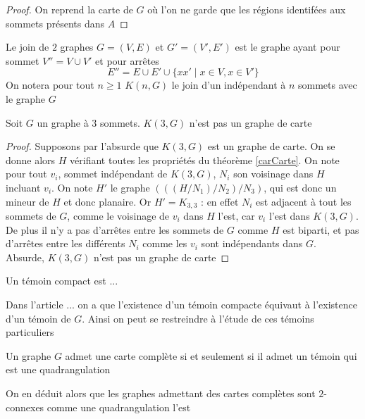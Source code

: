 \documentclass{scrartcl}
\begin{document}
\begin{flushleft}
\begin{proof}
    On reprend la carte de $G$ où l'on ne garde que les régions identifées aux sommets présents dans $A$
\end{proof}

\begin{def*}[Join]
    Le join de $2$ graphes $G = (V, E)$ et $G' = (V', E')$ est le graphe ayant pour sommet $V'' = V \cup V'$ et pour arrêtes
    \[ E'' = E \cup E' \cup \{ xx' \mid x \in V, x \in V' \} \]
    On notera pour tout $n \geq 1$ $K(n, G)$ le join d'un indépendant à $n$ sommets avec le graphe $G$
\end{def*}

\begin{prop}
    Soit $G$ un graphe à $3$ sommets. $K(3, G)$ n'est pas un graphe de carte
\end{prop}

\begin{proof}
    Supposons par l'absurde que $K(3, G)$ est un graphe de carte. On se donne alors $H$ vérifiant toutes les propriétés
    du théorème \ref{carCarte}. On note pour tout $v_i$, sommet indépendant de $K(3, G)$, $N_i$ son voisinage dans $H$
    incluant $v_i$. On note $H'$ le graphe $(((H / N_1) / N_2) / N_3)$, qui est donc un mineur de $H$ et donc planaire.
    Or $H' = K_{3,3}$ : en effet $N_i$ est adjacent à tout les sommets de $G$, comme le voisinage de $v_i$ dans $H$ l'est,
    car $v_i$ l'est dans $K(3, G)$. De plus il n'y a pas d'arrêtes entre les sommets de $G$ comme $H$ est biparti, et pas
    d'arrêtes entre les différents $N_i$ comme les $v_i$ sont indépendants dans $G$.\\
    Absurde, $K(3, G)$ n'est pas un graphe de carte
\end{proof}

\begin{def*}
    Un témoin compact est ...
\end{def*}

Dans l'article ... on a que l'existence d'un témoin compacte équivaut à l'existence d'un témoin de $G$. Ainsi on peut se restreindre
à l'étude de ces témoins particuliers

\begin{theorem}\label{complQuadr}
    Un graphe $G$ admet une carte complète si et seulement si il admet un témoin qui est une quadrangulation
\end{theorem}

On en déduit alors que les graphes admettant des cartes complètes sont $2$-connexes comme une quadrangulation l'est


\end{flushleft}
\end{document}
